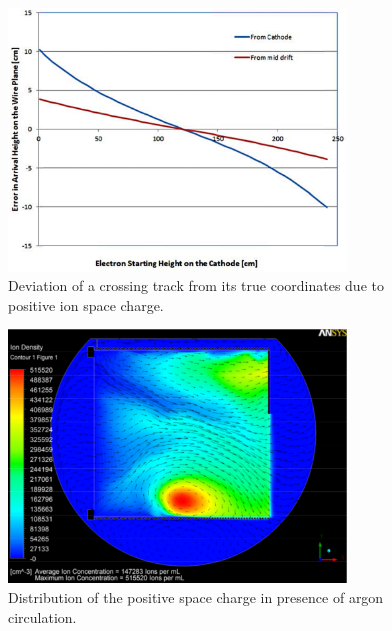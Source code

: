 \begin{figure}
\centering	
\includegraphics[width=0.8\textwidth]{figures/Coordinate.pdf}
\caption{Deviation of a crossing track from its true coordinates due to positive ion space charge.}
\label{Coordinates}
\end{figure}

\begin{figure}
\centering	
\includegraphics[width=0.8\textwidth]{figures/Voirin.pdf}
\caption{Distribution of the positive space charge in presence of argon circulation.}
\label{Voirin}
\end{figure}


